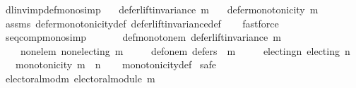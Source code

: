 \begin{isabellebody}
\ dl{\isacharunderscore}{\kern0pt}inv{\isacharunderscore}{\kern0pt}imp{\isacharunderscore}{\kern0pt}def{\isacharunderscore}{\kern0pt}mono{\isacharbrackleft}{\kern0pt}simp{\isacharbrackright}{\kern0pt}{\isacharcolon}{\kern0pt}\isanewline
\ \ \ {\isachardoublequoteopen}defer{\isacharunderscore}{\kern0pt}lift{\isacharunderscore}{\kern0pt}invariance\ m{\isachardoublequoteclose}\isanewline
\ \ \ {\isachardoublequoteopen}defer{\isacharunderscore}{\kern0pt}monotonicity\ m{\isachardoublequoteclose}\isanewline
%
\isadelimproof
\ \ %
\endisadelimproof
%
\isatagproof
{}\isamarkupfalse%
\ assms\ defer{\isacharunderscore}{\kern0pt}monotonicity{\isacharunderscore}{\kern0pt}def\ defer{\isacharunderscore}{\kern0pt}lift{\isacharunderscore}{\kern0pt}invariance{\isacharunderscore}{\kern0pt}def\isanewline
\ \ \isamarkupfalse%
\ fastforce%
\endisatagproof
{\isafoldproof}%
%
\isadelimproof
\isanewline
%
\endisadelimproof
\isanewline
\isanewline
{}\isamarkupfalse%
\ seq{\isacharunderscore}{\kern0pt}comp{\isacharunderscore}{\kern0pt}mono{\isacharbrackleft}{\kern0pt}simp{\isacharbrackright}{\kern0pt}{\isacharcolon}{\kern0pt}\isanewline
\ \ \isanewline
\ \ \ \ def{\isacharunderscore}{\kern0pt}monotone{\isacharunderscore}{\kern0pt}m{\isacharcolon}{\kern0pt}\ {\isachardoublequoteopen}defer{\isacharunderscore}{\kern0pt}lift{\isacharunderscore}{\kern0pt}invariance\ m{\isachardoublequoteclose}\ \isanewline
\ \ \ \ non{\isacharunderscore}{\kern0pt}ele{\isacharunderscore}{\kern0pt}m{\isacharcolon}{\kern0pt}\ {\isachardoublequoteopen}non{\isacharunderscore}{\kern0pt}electing\ m{\isachardoublequoteclose}\ \isanewline
\ \ \ \ def{\isacharunderscore}{\kern0pt}one{\isacharunderscore}{\kern0pt}m{\isacharcolon}{\kern0pt}\ {\isachardoublequoteopen}defers\ {}\ m{\isachardoublequoteclose}\ \isanewline
\ \ \ \ electing{\isacharunderscore}{\kern0pt}n{\isacharcolon}{\kern0pt}\ {\isachardoublequoteopen}electing\ n{\isachardoublequoteclose}\isanewline
\ \ \ {\isachardoublequoteopen}monotonicity\ {\isacharparenleft}{\kern0pt}m\ {\isasymtriangleright}\ n{\isacharparenright}{\kern0pt}{\isachardoublequoteclose}\isanewline
%
\isadelimproof
\ \ %
\endisadelimproof
%
\isatagproof
{}\isamarkupfalse%
\ monotonicity{\isacharunderscore}{\kern0pt}def\isanewline
{}\isamarkupfalse%
\ {\isacharparenleft}{\kern0pt}safe{\isacharparenright}{\kern0pt}\isanewline
\ \ \isamarkupfalse%
\ electoral{\isacharunderscore}{\kern0pt}mod{\isacharunderscore}{\kern0pt}m{\isacharcolon}{\kern0pt}\ {\isachardoublequoteopen}electoral{\isacharunderscore}{\kern0pt}module\ m{\isachardoublequoteclose}\isanewline

\end{isabellebody}
